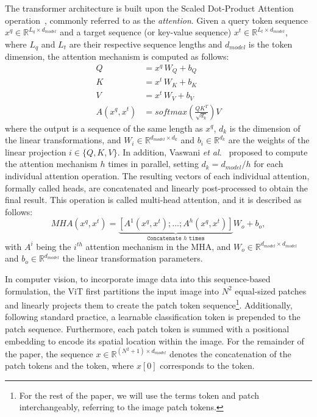 The transformer architecture is built upon the Scaled Dot-Product Attention operation~\cite{vaswani2017attention}, commonly referred to as the \emph{attention}. Given a query token sequence ${x}^q \in \mathbb{R}^{L_q \times d_{model}}$ and a target sequence (or key-value sequence) ${x}^t \in \mathbb{R}^{L_t \times d_{model}}$, where $L_q$ and $L_t$ are their respective sequence lengths and $d_{model}$ is the token dimension, the attention mechanism is computed as follows:
\begin{equation}\label{eq:attn}
\begin{split}
    Q &= x^q\,W_Q + b_Q \\
    K &= x^t\,W_K + b_K \\
    V &= x^t\,W_V + b_V \\
    A(x^q, x^t) &= softmax\left(\frac{QK^T}{\sqrt{d_k}}\right)V
\end{split}
\end{equation}
where the output is a sequence of the same length as $x^q$, $d_k$ is the dimension of the linear transformations, and $W_i\in\mathbb{R}^{d_{model}\times d_k}$ and $b_i\in\mathbb{R}^{d_k}$ are the weights of the linear projection $i\in\{Q, K, V\}$. In addition, Vaswani \textit{et al.}~\cite{vaswani2017attention} proposed to compute the attention mechanism $h$ times in parallel, setting $d_k = d_{model} / h$ for each individual attention operation. The resulting vectors of each individual attention, formally called heads, are concatenated and linearly post-processed to obtain the final result. This operation is called multi-head attention, and it is described as follows:
\begin{equation}
    MHA(x^q, x^t) = \underbrace{[A^1(x^q, x^t); ...; A^h(x^q, x^t)]}_{\texttt{Concatenate $h$ times}}W_o + b_o,
\end{equation}
with $A^i$ being the $i^{th}$ attention mechanism in the MHA, and $W_o\in\mathbb{R}^{d_{model}\times d_{model}}$ and $b_o\in\mathbb{R}^{d_{model}}$ the linear transformation parameters. 

In computer vision, to incorporate image data into this sequence-based formulation, the ViT first partitions the input image into $N^2$ equal-sized patches and linearly projects them to create the patch token sequence\footnote{For the rest of the paper, we will use the terms token and patch interchangeably, referring to the image patch tokens.}.
Additionally, following standard practice, a learnable classification token \CLS is prepended to the patch sequence. Furthermore, each patch token is summed with a positional embedding to encode its spatial location within the image. For the remainder of the paper, the sequence $x \in \mathbb{R}^{(N^2 + 1) \times d_{model}}$ denotes the concatenation of the patch tokens and the \CLS token, where $x[0]$ corresponds to the \CLS token.


